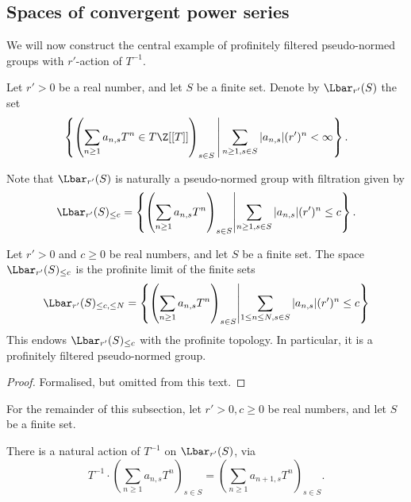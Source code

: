 
\subsection{Spaces of convergent power series}

We will now construct the central example of
profinitely filtered pseudo-normed groups with $r'$-action of $T^{-1}$.

\begin{definition}
  \label{Lbar}
  \leanok
  Let $r' > 0$ be a real number, and let $S$ be a finite set.
  Denote by $\Lbar_{r'}(S)$ the set
  \[
    \left\{ \left( \sum_{n \ge 1} a_{n,s} T^n \in T\Z[[T]]\right)_{s \in S} \,\middle\vert\, \sum_{n \ge 1, s \in S} |a_{n,s}| (r')^n < \infty \right\}.
  \]

  Note that $\Lbar_{r'}(S)$ is naturally a pseudo-normed group
  with filtration given by
  \[
    \Lbar_{r'}(S)_{\le c} =
    \left\{ \left( \sum_{n \ge 1} a_{n,s} T^n \right)_{s \in S} \middle\vert \sum_{n \ge 1, s \in S} |a_{n,s}| (r')^n \le c \right\}.
  \]
\end{definition}

\begin{lemma}
  \label{Lbar_profinitely_filtered}
  \leanok
  Let $r' > 0$ and $c \ge 0$ be real numbers, and let $S$ be a finite set.
  The space $\Lbar_{r'}(S)_{\le c}$ is the profinite limit of the finite sets
  \[
    \Lbar_{r'}(S)_{\le c, \le N} =
    \left\{ \left( \sum_{n \ge 1} a_{n,s} T^n \right)_{s \in S} \middle\vert
    \sum_{1 \le n \le N, s \in S} |a_{n,s}| (r')^n \le c \right\}
  \]
  This endows $\Lbar_{r'}(S)_{\le c}$ with the profinite topology.
  In particular, it is a profinitely filtered pseudo-normed group.
\end{lemma}

\begin{proof}
  \leanok
  Formalised, but omitted from this text.
\end{proof}

For the remainder of this subsection,
let $r' > 0, c \ge 0$ be real numbers,
and let $S$ be a finite set.

\begin{definition}
  \label{Lbar_Tinv}
  \leanok
  There is a natural action of $T^{-1}$ on $\Lbar_{r'}(S)$, via
  \[
    T^{-1} \cdot
    \left( \sum_{n \ge 1} a_{n,s} T^n \right)_{s \in S} =
    \left( \sum_{n \ge 1} a_{n+1,s} T^n \right)_{s \in S}.
  \]
\end{definition}

